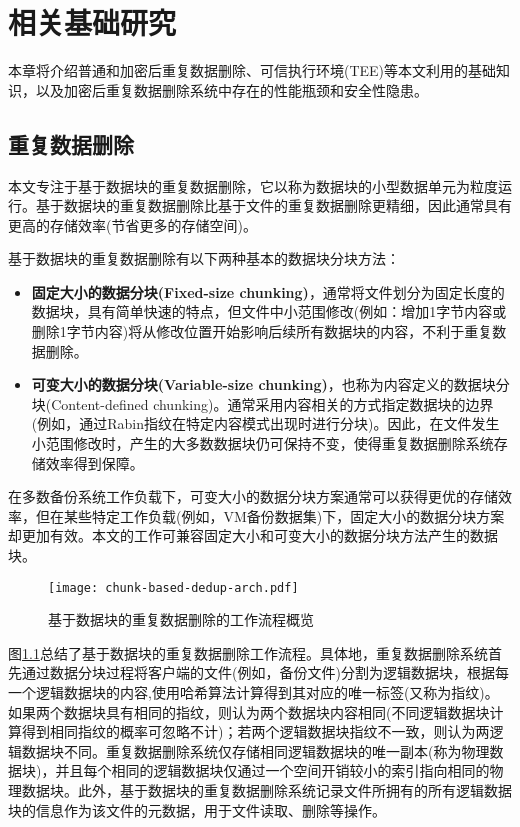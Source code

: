 \chapter{相关基础研究}
\label{chapter:background}

本章将介绍普通和加密后重复数据删除、可信执行环境(TEE)等本文利用的基础知识，以及加密后重复数据删除系统中存在的性能瓶颈和安全性隐患。

\section{重复数据删除}
\label{sec:background-deduplication}

本文专注于基于数据块的重复数据删除，它以称为数据块的小型数据单元为粒度运行。基于数据块的重复数据删除比基于文件的重复数据删除更精细，因此通常具有更高的存储效率(节省更多的存储空间)。

基于数据块的重复数据删除有以下两种基本的数据块分块方法：

\begin{itemize}[leftmargin=*]
    \item \textbf{固定大小的数据分块(Fixed-size chunking)}，通常将文件划分为固定长度的数据块，具有简单快速的特点，但文件中小范围修改(例如：增加1字节内容或删除1字节内容)将从修改位置开始影响后续所有数据块的内容，不利于重复数据删除。
    \item \textbf{可变大小的数据分块(Variable-size chunking)}，也称为内容定义的数据块分块(Content-defined chunking)。通常采用内容相关的方式指定数据块的边界(例如，通过Rabin指纹\cite{rabin1981fingerprinting}在特定内容模式出现时进行分块)。因此，在文件发生小范围修改时，产生的大多数数据块仍可保持不变，使得重复数据删除系统存储效率得到保障。
\end{itemize}

在多数备份系统工作负载\cite{zhu2008avoiding,lillibridge2009sparse}下，可变大小的数据分块方案通常可以获得更优的存储效率，但在某些特定工作负载(例如，VM备份数据集\cite{jin2009effectiveness})下，固定大小的数据分块方案却更加有效。本文的工作可兼容固定大小和可变大小的数据分块方法产生的数据块。

\begin{figure}[!htb]
    \small
    \centering
    \texttt{[image: chunk-based-dedup-arch.pdf]}
    \caption{基于数据块的重复数据删除的工作流程概览}
    \label{fig:chunk-based-dedup-flow}
\end{figure}

图\ref{fig:chunk-based-dedup-flow}总结了基于数据块的重复数据删除工作流程。具体地，重复数据删除系统首先通过数据分块过程将客户端的文件(例如，备份文件)分割为逻辑数据块，根据每一个逻辑数据块的内容,使用哈希算法计算得到其对应的唯一标签(又称为指纹)。如果两个数据块具有相同的指纹，则认为两个数据块内容相同(不同逻辑数据块计算得到相同指纹的概率可忽略不计\cite{black2006compare})；若两个逻辑数据块指纹不一致，则认为两逻辑数据块不同。重复数据删除系统仅存储相同逻辑数据块的唯一副本(称为物理数据块)，并且每个相同的逻辑数据块仅通过一个空间开销较小的索引指向相同的物理数据块。此外，基于数据块的重复数据删除系统记录文件所拥有的所有逻辑数据块的信息作为该文件的元数据，用于文件读取、删除等操作。

